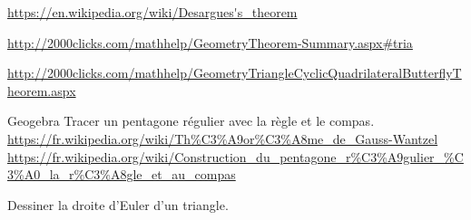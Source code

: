 \url{https://en.wikipedia.org/wiki/Desargues's_theorem}

\url{http://2000clicks.com/mathhelp/GeometryTheorem-Summary.aspx#tria}

\url{http://2000clicks.com/mathhelp/GeometryTriangleCyclicQuadrilateralButterflyTheorem.aspx}

\begin{exercice}
    Geogebra
    Tracer un pentagone régulier avec la règle et le compas.
    \url{https://fr.wikipedia.org/wiki/Th%C3%A9or%C3%A8me_de_Gauss-Wantzel}
    \url{https://fr.wikipedia.org/wiki/Construction_du_pentagone_r%C3%A9gulier_%C3%A0_la_r%C3%A8gle_et_au_compas}
\end{exercice}


\begin{exercice}
Dessiner la droite d'Euler d'un triangle.
\end{exercice}
